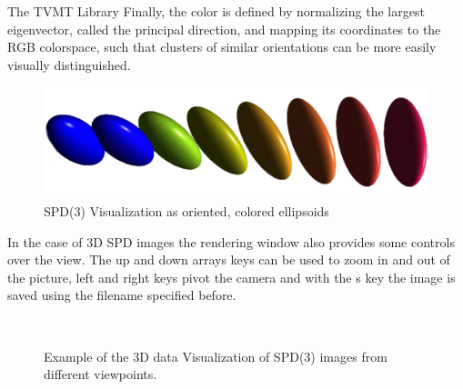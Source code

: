 \begin{chapter}{The TVMT Library}
Finally, the color is defined by normalizing the largest eigenvector, called the principal direction, and mapping its coordinates to the RGB colorspace, such that clusters of
similar orientations can be more easily visually distinguished.

\begin{figure}[h!]
        \centering
	    \includegraphics[width=0.8\linewidth]{./figures/library/ellipsoids.pdf}
	    \caption[SPD(3) ellipsoid visualization]{SPD(3) Visualization as oriented, colored ellipsoids}
	\label{fig:ellipsoid_visualization}
\end{figure}

In the case of 3D SPD images the rendering window also provides some controls over the view. The up and down arrays keys can be used to zoom in and out of the picture, left and right keys
pivot the camera and with the s key the image is saved using the filename specified before.
\begin{figure}[h!]
    \centering
    \\
    \caption[3D SPD(3) Volume Visualization of a helix]{Example of the 3D data Visualization of SPD(3) images from different viewpoints.
	\label{fig:helix}
    }
\end{figure}


\end{chapter}
